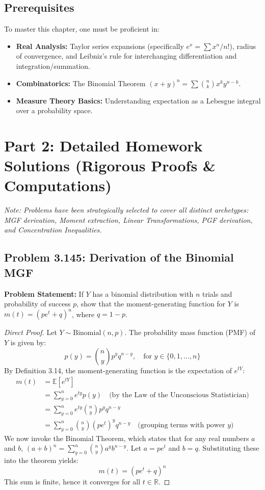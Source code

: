 \documentclass[11pt, a4paper]{article}
\theoremstyle{definition}
\theoremstyle{remark}
\newcommand{\E}{\mathbb{E}}
\newcommand{\R}{\mathbb{R}}
\begin{document}
\subsection{Prerequisites}
To master this chapter, one must be proficient in:
\begin{itemize}
    \item \textbf{Real Analysis:} Taylor series expansions (specifically $e^x = \sum x^n/n!$), radius of convergence, and Leibniz's rule for interchanging differentiation and integration/summation.
    \item \textbf{Combinatorics:} The Binomial Theorem $(x+y)^n = \sum \binom{n}{k} x^k y^{n-k}$.
    \item \textbf{Measure Theory Basics:} Understanding expectation as a Lebesgue integral over a probability space.
\end{itemize}

\newpage
\section{Part 2: Detailed Homework Solutions (Rigorous Proofs \& Computations)}

\textit{Note: Problems have been strategically selected to cover all distinct archetypes: MGF derivation, Moment extraction, Linear Transformations, PGF derivation, and Concentration Inequalities.}

\subsection{Problem 3.145: Derivation of the Binomial MGF}
\textbf{Problem Statement:} If $Y$ has a binomial distribution with $n$ trials and probability of success $p$, show that the moment-generating function for $Y$ is $m(t) = (pe^t + q)^n$, where $q = 1 - p$.

\begin{proof}[Direct Proof]
Let $Y \sim \text{Binomial}(n, p)$. The probability mass function (PMF) of $Y$ is given by:
\[ p(y) = \binom{n}{y} p^y q^{n-y}, \quad \text{for } y \in \{0, 1, \dots, n\} \]
By Definition 3.14, the moment-generating function is the expectation of $e^{tY}$:
\begin{align*}
    m(t) &= \E[e^{tY}] \\
         &= \sum_{y=0}^{n} e^{ty} p(y) \quad \text{(by the Law of the Unconscious Statistician)} \\
         &= \sum_{y=0}^{n} e^{ty} \binom{n}{y} p^y q^{n-y} \\
         &= \sum_{y=0}^{n} \binom{n}{y} (pe^t)^y q^{n-y} \quad \text{(grouping terms with power } y \text{)}
\end{align*}
We now invoke the Binomial Theorem, which states that for any real numbers $a$ and $b$, $(a+b)^n = \sum_{y=0}^n \binom{n}{y} a^y b^{n-y}$. Let $a = pe^t$ and $b = q$. Substituting these into the theorem yields:
\[ m(t) = (pe^t + q)^n \]
This sum is finite, hence it converges for all $t \in \R$. 
\end{proof}
\end{document}
